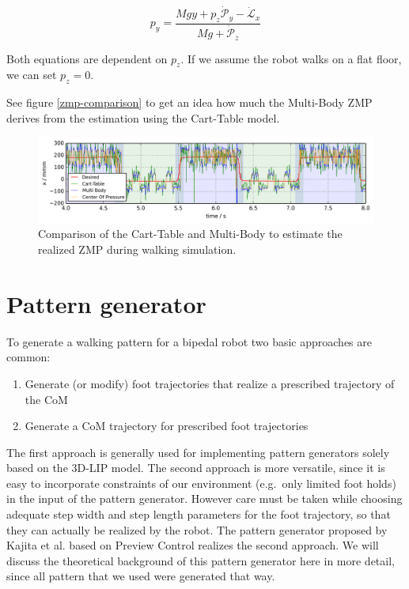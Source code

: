 \documentclass[english,ngerman]{KITreprt}
\begin{document}
\begin{equation}
p_y = \frac{Mgy + p_z \dot{\mathcal{P}}_y - \dot{\mathcal{L}}_x}{Mg + \dot{\mathcal{P}}_z}
\end{equation}

Both equations are dependent on $p_z$. If we assume the robot walks on a
flat floor, we can set $p_z = 0$.

See figure \ref{zmp-comparison} to get an idea how much the Multi-Body
ZMP derives from the estimation using the Cart-Table model.

\begin{figure}[tb]
\includegraphics[width=\textwidth,resolution=300]{images/zmp_comparison.png}
\caption{Comparison of the Cart-Table and Multi-Body to estimate the realized ZMP during walking simulation.}
\label{img:zmp-comparison}
\end{figure}

\chapter{Pattern generator}\label{pattern-generator}

To generate a walking pattern for a bipedal robot two basic approaches
are common:

\begin{enumerate}
\def\labelenumi{\arabic{enumi}.}
\item
  Generate (or modify) foot trajectories that realize a prescribed
  trajectory of the CoM
\item
  Generate a CoM trajectory for prescribed foot trajectories
\end{enumerate}

The first approach is generally used for implementing pattern generators
solely based on the 3D-LIP model. \cite{kajita20013d} The second
approach is more versatile, since it is easy to incorporate constraints
of our environment (e.g.~only limited foot holds) in the input of the
pattern generator. However care must be taken while choosing adequate
step width and step length parameters for the foot trajectory, so that
they can actually be realized by the robot. The pattern generator
proposed by Kajita et al. \cite{kajita2003biped} based on Preview
Control realizes the second approach. We will discuss the theoretical
background of this pattern generator here in more detail, since all
pattern that we used were generated that way.
\end{document}
